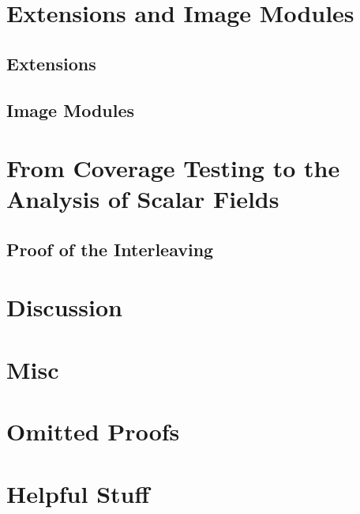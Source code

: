 \documentclass[12pt]{article}
\begin{document}
\clearpage
\section{Extensions and Image Modules}
%


\subsection{Extensions}
  

\subsection{Image Modules}


\clearpage
\section{From Coverage Testing to the Analysis of Scalar Fields}





\subsection{Proof of the Interleaving}
  


\clearpage
\section{Discussion}
  




\clearpage
\appendix
\section{Misc}



\section{Omitted Proofs}\label{apx:omit}
\printproofs

\section{Helpful Stuff}

\end{document}
